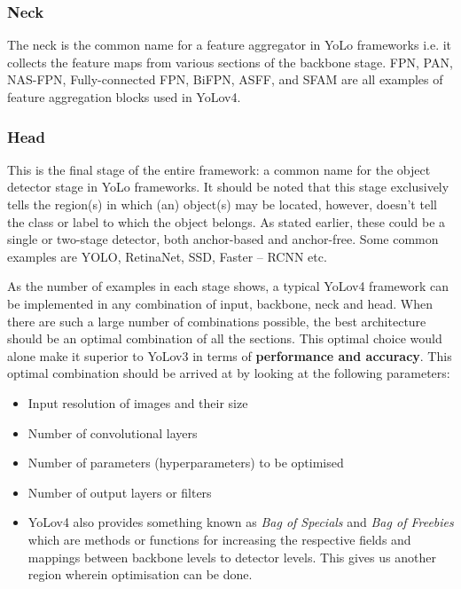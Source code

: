 \subsubsection{Neck}
The neck is the common name for a feature aggregator in YoLo frameworks i.e. it collects the feature maps from various sections of the backbone stage. FPN, PAN, NAS-FPN, Fully-connected FPN, BiFPN, ASFF, and SFAM are all examples of feature aggregation blocks used in YoLov4.

\subsubsection{Head}
This is the final stage of the entire framework: a common name for the object detector stage in YoLo frameworks. It should be noted that this stage exclusively tells the region(s) in which (an) object(s) may be located, however, doesn’t tell the class or label to which the object belongs. As stated earlier, these could be a single or two-stage detector, both anchor-based and anchor-free. Some common examples are YOLO, RetinaNet, SSD, Faster – RCNN etc.

As the number of examples in each stage shows, a typical YoLov4 framework can be implemented in any combination of input, backbone, neck and head. When there are such a large number of combinations possible, the best architecture should be an optimal combination of all the sections. This optimal choice would alone make it superior to YoLov3 in terms of \textbf{performance and accuracy}. This optimal combination should be arrived at by looking at the following parameters:

\begin{itemize}
\item Input resolution of images and their size
\item Number of convolutional layers
\item Number of parameters (hyperparameters) to be optimised
\item Number of output layers or filters
\item YoLov4 also provides something known as \textit{Bag of Specials} and \textit{Bag of Freebies} which are methods or functions for increasing the respective fields and mappings between backbone levels to detector levels. This gives us another region wherein optimisation can be done.

\end{itemize}

\newpage

